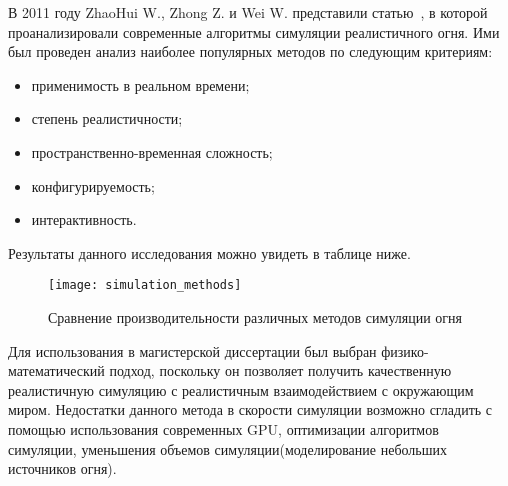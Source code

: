 В 2011 году ZhaoHui W., Zhong Z. и Wei W. представили статью~\cite{survey}, в
которой проанализировали
современные алгоритмы симуляции реалистичного огня. Ими был проведен анализ
наиболее популярных методов по следующим критериям:
\begin{itemize}
	\item применимость в реальном времени;
	\item степень реалистичности;
	\item пространственно-временная сложность;
	\item конфигурируемость;
	\item интерактивность.
\end{itemize}
Результаты данного исследования можно увидеть в таблице ниже.

\begin{figure}[htb]
	\centering
	\texttt{[image: simulation\_methods]}
	\caption{Сравнение производительности различных методов симуляции огня}
\end{figure}

Для использования в магистерской диссертации был выбран физико-математический
подход, поскольку он позволяет получить качественную реалистичную симуляцию с
реалистичным взаимодействием с окружающим миром. Недостатки данного метода в
скорости симуляции возможно сгладить с помощью использования современных GPU,
оптимизации алгоритмов симуляции, уменьшения объемов симуляции(моделирование
небольших источников огня).
